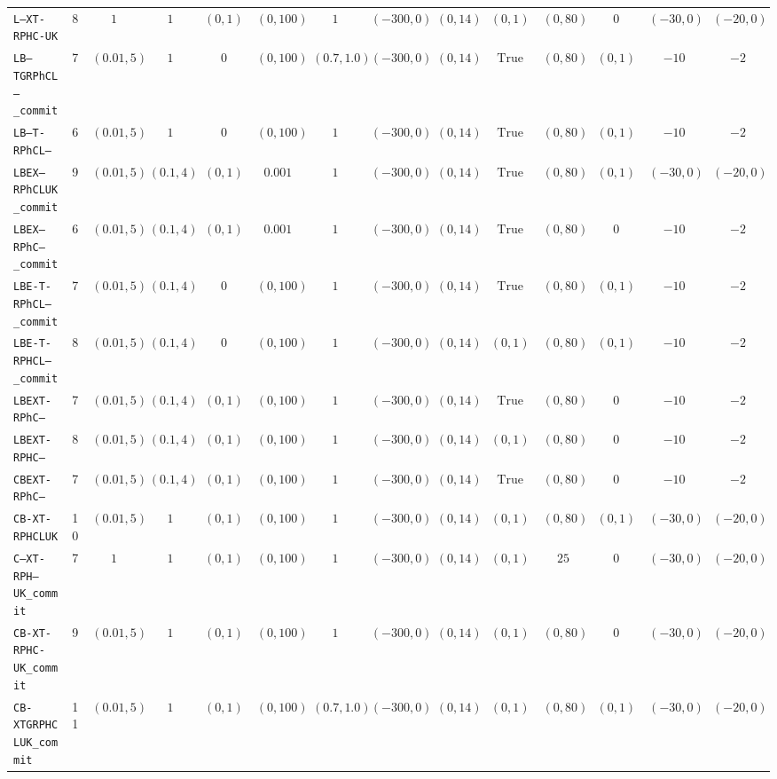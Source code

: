 {\begin{tabular}{lccccccccccccc}
\texttt{L--XT-RPHC-UK} & 8 & $1$ & $1$ & $(0,1)$ & $(0,100)$ & $1$ & $(-300,0)$ & $(0,14)$ & $(0,1)$ & $(0,80)$ & $0$ & $(-30,0)$ & $(-20,0)$ \\
\texttt{LB--TGRPhCL--_commit} & 7 & $(0.01,5)$ & $1$ & $0$ & $(0,100)$ & $(0.7,1.0)$ & $(-300,0)$ & $(0,14)$ & $\mathrm{True}$ & $(0,80)$ & $(0,1)$ & $-10$ & $-2$ \\
\texttt{LB--T-RPhCL--} & 6 & $(0.01,5)$ & $1$ & $0$ & $(0,100)$ & $1$ & $(-300,0)$ & $(0,14)$ & $\mathrm{True}$ & $(0,80)$ & $(0,1)$ & $-10$ & $-2$ \\
\texttt{LBEX--RPhCLUK_commit} & 9 & $(0.01,5)$ & $(0.1,4)$ & $(0,1)$ & $0.001$ & $1$ & $(-300,0)$ & $(0,14)$ & $\mathrm{True}$ & $(0,80)$ & $(0,1)$ & $(-30,0)$ & $(-20,0)$ \\
\texttt{LBEX--RPhC---_commit} & 6 & $(0.01,5)$ & $(0.1,4)$ & $(0,1)$ & $0.001$ & $1$ & $(-300,0)$ & $(0,14)$ & $\mathrm{True}$ & $(0,80)$ & $0$ & $-10$ & $-2$ \\
\texttt{LBE-T-RPhCL--_commit} & 7 & $(0.01,5)$ & $(0.1,4)$ & $0$ & $(0,100)$ & $1$ & $(-300,0)$ & $(0,14)$ & $\mathrm{True}$ & $(0,80)$ & $(0,1)$ & $-10$ & $-2$ \\
\texttt{LBE-T-RPHCL--_commit} & 8 & $(0.01,5)$ & $(0.1,4)$ & $0$ & $(0,100)$ & $1$ & $(-300,0)$ & $(0,14)$ & $(0,1)$ & $(0,80)$ & $(0,1)$ & $-10$ & $-2$ \\
\texttt{LBEXT-RPhC---} & 7 & $(0.01,5)$ & $(0.1,4)$ & $(0,1)$ & $(0,100)$ & $1$ & $(-300,0)$ & $(0,14)$ & $\mathrm{True}$ & $(0,80)$ & $0$ & $-10$ & $-2$ \\
\texttt{LBEXT-RPHC---} & 8 & $(0.01,5)$ & $(0.1,4)$ & $(0,1)$ & $(0,100)$ & $1$ & $(-300,0)$ & $(0,14)$ & $(0,1)$ & $(0,80)$ & $0$ & $-10$ & $-2$ \\
\texttt{CBEXT-RPhC---} & 7 & $(0.01,5)$ & $(0.1,4)$ & $(0,1)$ & $(0,100)$ & $1$ & $(-300,0)$ & $(0,14)$ & $\mathrm{True}$ & $(0,80)$ & $0$ & $-10$ & $-2$ \\
\texttt{CB-XT-RPHCLUK} & 10 & $(0.01,5)$ & $1$ & $(0,1)$ & $(0,100)$ & $1$ & $(-300,0)$ & $(0,14)$ & $(0,1)$ & $(0,80)$ & $(0,1)$ & $(-30,0)$ & $(-20,0)$ \\
\texttt{C--XT-RPH--UK_commit} & 7 & $1$ & $1$ & $(0,1)$ & $(0,100)$ & $1$ & $(-300,0)$ & $(0,14)$ & $(0,1)$ & $25$ & $0$ & $(-30,0)$ & $(-20,0)$ \\
\texttt{CB-XT-RPHC-UK_commit} & 9 & $(0.01,5)$ & $1$ & $(0,1)$ & $(0,100)$ & $1$ & $(-300,0)$ & $(0,14)$ & $(0,1)$ & $(0,80)$ & $0$ & $(-30,0)$ & $(-20,0)$ \\
\texttt{CB-XTGRPHCLUK_commit} & 11 & $(0.01,5)$ & $1$ & $(0,1)$ & $(0,100)$ & $(0.7,1.0)$ & $(-300,0)$ & $(0,14)$ & $(0,1)$ & $(0,80)$ & $(0,1)$ & $(-30,0)$ & $(-20,0)$ \\

\end{tabular}}
